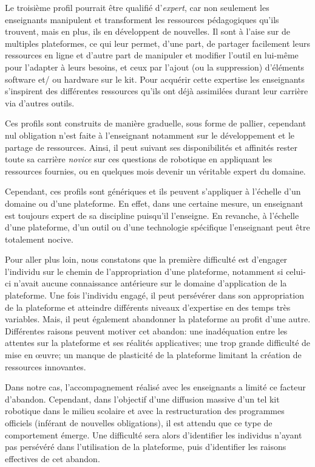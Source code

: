         Le troisième profil pourrait être qualifié d'\textit{expert}, car non seulement les enseignants manipulent et transforment les ressources pédagogiques qu'ils trouvent, mais en plus, ils en développent de nouvelles. Il sont à l'aise sur de multiples plateformes, ce qui leur permet, d'une part, de partager facilement leurs ressources en ligne et d'autre part de manipuler et modifier l'outil en lui-même pour l'adapter à leurs besoins, et ceux par l'ajout (ou la suppression) d'éléments software et/ ou hardware sur le kit. Pour acquérir cette expertise les enseignants s'inspirent des différentes ressources qu'ils ont déjà assimilées durant leur carrière via d'autres outils.\par%
        Ces profils sont construits de manière graduelle, sous forme de pallier, cependant nul obligation n'est faite à l'enseignant notamment sur le développement et le partage de ressources. Ainsi, il peut suivant ses disponibilités et affinités rester toute sa carrière  \textit{novice} sur ces questions de robotique en appliquant les ressources fournies, ou en quelques mois devenir un véritable expert du domaine.\par%
        Cependant, ces profils sont génériques et ils peuvent s'appliquer à l'échelle d'un domaine ou d'une plateforme. En effet, dans une certaine mesure, un enseignant est toujours expert de sa discipline puisqu'il l'enseigne. En revanche, à l'échelle d'une plateforme, d'un outil ou d'une technologie spécifique l'enseignant peut être totalement nocive.\par%
        Pour aller plus loin, nous constatons que la première difficulté est d'engager l'individu sur le chemin de l'appropriation  d'une plateforme, notamment si celui-ci n'avait aucune connaissance antérieure sur le domaine d'application de la plateforme. Une fois l'individu engagé, il peut persévérer dans son appropriation de la plateforme et atteindre différents niveaux d'expertise en des temps très variables. Mais, il peut également abandonner la plateforme au profit d'une autre.
        Différentes raisons peuvent motiver cet abandon: une inadéquation entre les attentes sur la plateforme et ses réalités applicatives; une trop grande difficulté de mise en œuvre; un manque de plasticité de la plateforme limitant la création de ressources innovantes.\par%
        Dans notre cas, l'accompagnement réalisé avec les enseignants a limité ce facteur d'abandon. Cependant, dans l'objectif d'une diffusion massive d'un tel kit robotique dans le milieu scolaire et avec la restructuration des programmes officiels (inférant de nouvelles obligations), il est attendu que ce type de comportement émerge. Une difficulté sera alors d'identifier les individus n'ayant pas persévéré dans l'utilisation de la plateforme, puis d'identifier les raisons effectives de cet abandon.
